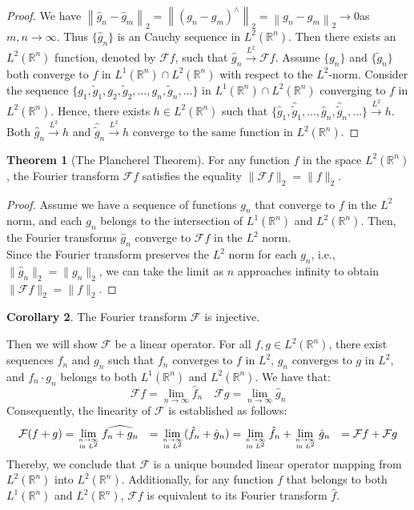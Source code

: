 \documentclass[12pt,openany]{book}
\theoremstyle{definition}
\newtheorem{theorem}{Theorem}[section]
\newtheorem{corollary}[theorem]{Corollary}
\begin{document}
\begin{proof}
We have
$\left\|\hat{g}_n-\hat{g}_m\right\|_2 = \left\|(g_n-g_m)^\wedge\right\|_2 = \left\|g_n-g_m\right\|_2 \rightarrow 0$as $m, n \rightarrow \infty$.
Thus $\{\hat{g}_n\}$ is an Cauchy sequence in $L^2(\mathbb{R}^n)$. Then there exists an $L^2(\mathbb{R}^n)$ function, denoted by $\mathcal{F}f$, such that $\hat{g}_n \xrightarrow{L^2} \mathcal{F}f$.
Assume $\{g_n\}$ and $\{\widetilde{g}_n\}$ both converge to $f$ in $L^1(\mathbb{R}^n) \cap L^2(\mathbb{R}^n)$ with respect to the $L^2$-norm.
Consider the sequence $\{g_1, \tilde{g}_1, g_2, \tilde{g}_2, \ldots, g_n, \tilde{g}_n, \ldots\}$ in $L^1(\mathbb{R}^n) \cap L^2(\mathbb{R}^n)$ converging to $f$ in $L^2(\mathbb{R}^n)$.
Hence, there exists $h \in L^2(\mathbb{R}^n)$ such that $\{\hat{g}_1, \hat{\tilde{g}}_1, \ldots, \hat{g}_n, \widehat{\tilde{g}}_n, \ldots\} \xrightarrow{L^2} h$.
Both $\hat{g}_n \xrightarrow{L^2} h$ and $\widehat{\tilde{g}}_n \xrightarrow{L^2} h$ converge to the same function in $L^2(\mathbb{R}^n)$. 
\end{proof}
\begin{theorem}[The Plancherel Theorem]
   For any function $f$ in the space $L^2(\mathbb{R}^n)$, the Fourier transform $\mathcal{F}f$ satisfies the equality $\|\mathcal{F}f\|_2 = \|f\|_2$.
\end{theorem}
\begin{proof}
Assume we have a sequence of functions $g_n$ that converge to $f$ in the $L^2$ norm, and each $g_n$ belongs to the intersection of $L^1(\mathbb{R}^n)$ and $L^2(\mathbb{R}^n)$. Then, the Fourier transforms $\hat{g}_n$ converge to $\mathcal{F}f$ in the $L^2$ norm.\\
Since the Fourier transform preserves the $L^2$ norm for each $g_n$, i.e., $\|\hat{g}_n\|_2 = \|g_n\|_2$, we can take the limit as $n$ approaches infinity to obtain $\|\mathcal{F}f\|_2 = \|f\|_2$.
\end{proof}
\begin{corollary}
    The Fourier transform $\mathcal{F}$ is injective.
\end{corollary}
Then we will show $\mathcal{F}$ be a linear operator. For all $f, g \in L^2(\mathbb{R}^n)$, there exist sequences ${f_n}$ and ${g_n}$ such that $f_n$ converges to $f$ in $L^2$, $g_n$ converges to $g$ in $L^2$, and $f_n \cdot g_n$ belongs to both $L^1(\mathbb{R}^n)$ and $L^2(\mathbb{R}^n)$. We have that:
$$\mathcal{F}f = \lim_{{n \to \infty} } \hat{f}_n \quad \mathcal{F}g = \lim_{{n \to \infty} } \hat{g}_n$$
Consequently, the linearity of $\mathcal{F}$ is established as follows:
$$\begin{aligned}
    \mathcal{F}(f+g) &= \lim_{{n \to \infty} \atop {\text{in } L^2}} \widehat{f_n + g_n}
&= \lim_{{n \to \infty} \atop {\text{in } L^2}} (\hat{f}_n + \hat{g}_n)
&= \lim_{{n \to \infty} \atop {\text{in } L^2}} \hat{f}_n + \lim_{{n \to \infty} \atop {\text{in } L^2}} \hat{g}_n
&= \mathcal{F}f + \mathcal{F}g
\end{aligned}$$
Thereby, we conclude that $\mathcal{F}$ is a unique bounded linear operator mapping from $L^2(\mathbb{R}^n)$ into $L^2(\mathbb{R}^n)$. Additionally, for any function $f$ that belongs to both $L^1(\mathbb{R}^n)$ and $L^2(\mathbb{R}^n)$, $\mathcal{F}f$ is equivalent to its Fourier transform $\hat{f}$.
\end{document}
